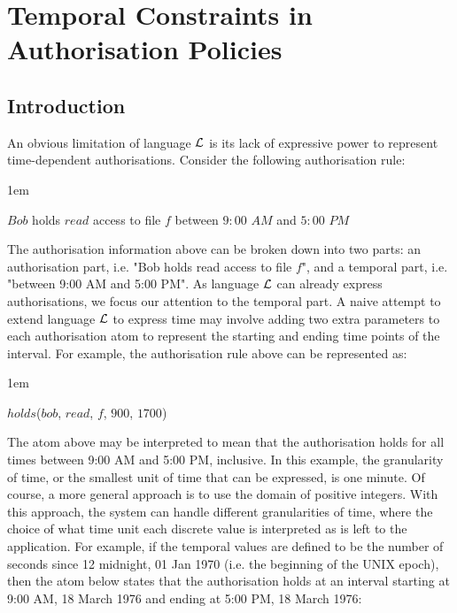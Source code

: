 \documentclass[11pt]{report}
\newenvironment{vquote}
{
  \begin{list}{}{\leftmargin 1em}\item[]
}
{
  \end{list}
}
\begin{document}
  \onehalfspacing

  \chapter{Temporal Constraints in Authorisation Policies}

    \section{Introduction}

      An obvious limitation of language ${\cal L}$ is its lack of expressive
      power to represent time-dependent authorisations. Consider the following
      authorisation rule:
  
      \begin{vquote}
        $Bob$ holds $read$ access to file $f$ between $9:00$ $AM$ and $5:00$
        $PM$
      \end{vquote}
  
      The authorisation information above can be broken down into two parts: an
      authorisation part, i.e. "Bob holds read access to file $f$", and a
      temporal part, i.e. "between 9:00 AM and 5:00 PM". As language ${\cal L}$
      can already express authorisations, we focus our attention to the
      temporal part. A naive attempt to extend language ${\cal L}$ to express
      time may involve adding two extra parameters to each authorisation atom
      to represent the starting and ending time points of the interval. For
      example, the authorisation rule above can be represented as:
  
      \begin{vquote}
        $holds$($bob$, $read$, $f$, $900$, $1700$)
      \end{vquote}

      The atom above may be interpreted to mean that the authorisation holds
      for all times between 9:00 AM and 5:00 PM, inclusive. In this example,
      the granularity of time, or the smallest unit of time that can be
      expressed, is one minute. Of course, a more general approach is to use
      the domain of positive integers. With this approach, the system can
      handle different granularities of time, where the choice of what time
      unit each discrete value is interpreted as is left to the application.
      For example, if the temporal values are defined to be the number of
      seconds since 12 midnight, 01 Jan 1970 (i.e. the beginning of the UNIX
      epoch), then the atom below states that the authorisation holds at an
      interval starting at 9:00 AM, 18 March 1976 and ending at 5:00 PM, 18
      March 1976:
 
\end{document}
